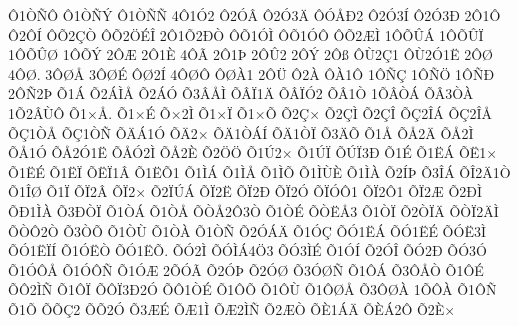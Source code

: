 {^^d41^^d2^^d1^^d4
^^d41^^d2^^d1^^dd
^^d41^^d2^^d1^^d1
4^^d41^^d32
^^d42^^d3^^c2
^^d42^^d33^^c4
^^d4^^d3^^c5^^d02
^^d42^^d33^^cd
^^d42^^d33^^d0
2^^d41^^d4
^^d42^^d4^^cd
^^d4^^d52^^c7^^d2
^^d4^^d52^^d6^^c9^^ce
2^^d41^^d52^^d0^^d2
^^d4^^d51^^d3^^cc
^^d4^^d51^^d3^^d4
^^d4^^d52^^c6^^cc
1^^d4^^d5^^db^^c1
1^^d4^^d5^^db^^cf
1^^d4^^d5^^db^^d8
1^^d4^^d5^^dd
2^^d4^^c6
2^^d41^^c8
4^^d4^^c3
2^^d41^^de
2^^d4^^db2
2^^d4^^dd
2^^d4^^df
^^d4^^d92^^c71
^^d4^^d92^^d31^^cb
2^^d4^^d8
4^^d4^^d8.
3^^d4^^d8^^c5
3^^d4^^d8^^c9
^^d4^^d82^^cd
4^^d4^^d8^^d4
^^d4^^d8^^c01
2^^d4^^dc
^^d42^^c0
^^d4^^c01^^d4
1^^d4^^d1^^c7
1^^d4^^d1^^d6
1^^d4^^d1^^d0
2^^d4^^d12^^de
^^d51^^c1
^^d52^^c1^^cc^^c5
^^d52^^c1^^d3
^^d53^^c2^^c5^^cc
^^d5^^c2^^cf1^^c4
^^d5^^c2^^cf^^d32
^^d5^^c21^^d2
1^^d5^^c2^^d2^^c1
^^d5^^c23^^d2^^c0
1^^d52^^c2^^d9^^d4
^^d51^^d7^^c5.
^^d51^^d7^^c9
^^d5^^d72^^cc
^^d51^^d7^^cf
^^d51^^d7^^d5
^^d52^^c7^^d7
^^d52^^c7^^cc
^^d52^^c7^^ce
^^d5^^c72^^ce^^c1
^^d5^^c72^^ce^^c5
^^d5^^c71^^d2^^c5
^^d5^^c71^^d2^^d1
^^d5^^c4^^c11^^d3
^^d5^^c42^^d7
^^d5^^c41^^d2^^c1^^cd
^^d5^^c41^^d2^^cf
^^d53^^c4^^d5
^^d51^^c5
^^d5^^c52^^c4
^^d5^^c52^^cc
^^d5^^c51^^d3
^^d5^^c52^^d31^^cb
^^d5^^c5^^d32^^cc
^^d5^^c52^^c8
^^d52^^d6^^d6
^^d51^^da2^^d7
^^d51^^da^^cf
^^d5^^da^^cf3^^d0
^^d51^^c9
^^d51^^cb^^c1
^^d5^^cb1^^d7
^^d51^^cb^^c9
^^d51^^cb^^cf
^^d5^^cb^^cf1^^c2
^^d51^^cb^^d51
^^d51^^cc^^c1
^^d51^^cc^^c5
^^d51^^cc^^d5
^^d51^^cc^^d9^^c8
^^d51^^cc^^c0
^^d52^^cd^^de
^^d53^^ce^^c1
^^d5^^ce2^^c41^^d2
^^d51^^ce^^d8
^^d51^^cf
^^d5^^cf2^^c2
^^d5^^cf2^^d7
^^d52^^cf^^da^^c1
^^d5^^cf2^^cb
^^d5^^cf2^^d0
^^d5^^cf2^^d3
^^d5^^cf^^d3^^d41
^^d5^^cf2^^d41
^^d5^^cf2^^c6
^^d52^^d0^^cc
^^d5^^d01^^cc^^c0
^^d53^^d0^^d2^^cf
^^d51^^d2^^c1
^^d51^^d2^^c5
^^d5^^d2^^c52^^d43^^d2
^^d51^^d2^^c9
^^d5^^d2^^cb^^c53
^^d51^^d2^^cf
^^d52^^d2^^cf^^c4
^^d5^^d2^^cf2^^c4^^cc
^^d5^^d2^^d42^^d2
^^d53^^d2^^d5
^^d51^^d2^^d9
^^d51^^d2^^c0
^^d51^^d2^^d1
^^d52^^d3^^c1^^c4
^^d51^^d3^^c7
^^d5^^d31^^cb^^c1
^^d5^^d31^^cb^^c9
^^d5^^d3^^cb3^^cc
^^d5^^d31^^cb^^cf^^cd
^^d51^^d3^^cb^^d2
^^d5^^d31^^cb^^d5.
^^d5^^d32^^cc
^^d5^^d3^^cc^^c14^^d63
^^d5^^d33^^cc^^c9
^^d51^^d3^^cd
^^d52^^d3^^ce
^^d5^^d32^^d0
^^d5^^d33^^d3
^^d51^^d3^^d4^^c5
^^d51^^d3^^d4^^d1
^^d51^^d3^^c6
2^^d5^^d3^^c3
^^d52^^d3^^de
^^d52^^d3^^d8
^^d53^^d3^^d8^^d1
^^d51^^d4^^c1
^^d53^^d4^^c5^^d2
^^d51^^d4^^c9
^^d5^^d42^^cc^^d1
^^d51^^d4^^cf
^^d5^^d4^^cf3^^d02^^d3
^^d5^^d41^^d2^^c9
^^d51^^d4^^d5
^^d51^^d4^^d9
^^d51^^d4^^d8^^c5
^^d53^^d4^^d8^^c0
1^^d5^^d4^^c0
^^d51^^d4^^d1
^^d51^^d5
^^d5^^d5^^c72
^^d5^^d52^^d3
^^d53^^c6^^c9
^^d5^^c61^^cc
^^d5^^c62^^cc^^d1
^^d52^^c6^^d2
^^d5^^c81^^c1^^c4
^^d5^^c8^^c12^^d4
^^d52^^c8^^d7
}
